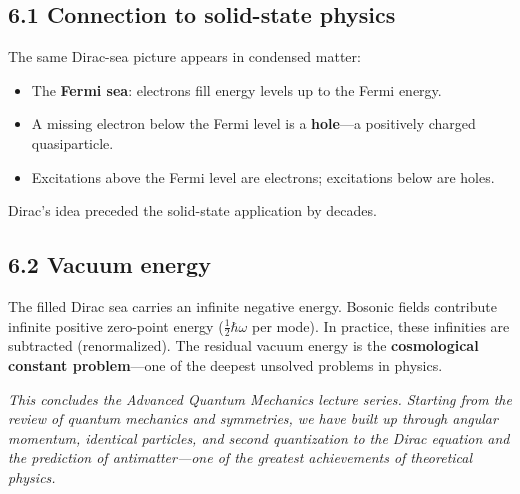 \documentclass[12pt,a4paper]{article}
\begin{document}
\subsection{6.1 Connection to solid-state physics}

The same Dirac-sea picture appears in condensed matter:
\begin{itemize}[nosep]
    \item The \textbf{Fermi sea}: electrons fill energy levels up to the Fermi energy.
    \item A missing electron below the Fermi level is a \textbf{hole}---a positively charged quasiparticle.
    \item Excitations above the Fermi level are electrons; excitations below are holes.
\end{itemize}
Dirac's idea preceded the solid-state application by decades.

\subsection{6.2 Vacuum energy}

The filled Dirac sea carries an infinite negative energy.  Bosonic fields contribute infinite positive zero-point energy ($\frac{1}{2}\hbar\omega$ per mode).  In practice, these infinities are subtracted (renormalized).  The residual vacuum energy is the \textbf{cosmological constant problem}---one of the deepest unsolved problems in physics.

\medskip
\noindent\textit{This concludes the Advanced Quantum Mechanics lecture series.  Starting from the review of quantum mechanics and symmetries, we have built up through angular momentum, identical particles, and second quantization to the Dirac equation and the prediction of antimatter---one of the greatest achievements of theoretical physics.}
\end{document}
